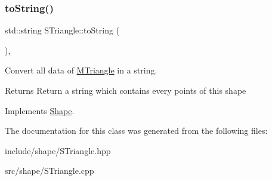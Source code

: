 \subsubsection{\texorpdfstring{to\+String()}{toString()}}
{\footnotesize\ttfamily std\+::string S\+Triangle\+::to\+String (\begin{DoxyParamCaption}{ }\end{DoxyParamCaption})\hspace{0.3cm}{\ttfamily [override]}, {\ttfamily [virtual]}}



Convert all data of \hyperlink{classMTriangle}{M\+Triangle} in a string. 

\begin{DoxyReturn}{Returns}
Return a string which contains every points of this shape 
\end{DoxyReturn}


Implements \hyperlink{classShape_a98fa87c6dc4c7045fd6897a8f3bc186c}{Shape}.



The documentation for this class was generated from the following files\+:\begin{DoxyCompactItemize}
\item 
include/shape/S\+Triangle.\+hpp\item 
src/shape/S\+Triangle.\+cpp\end{DoxyCompactItemize}
